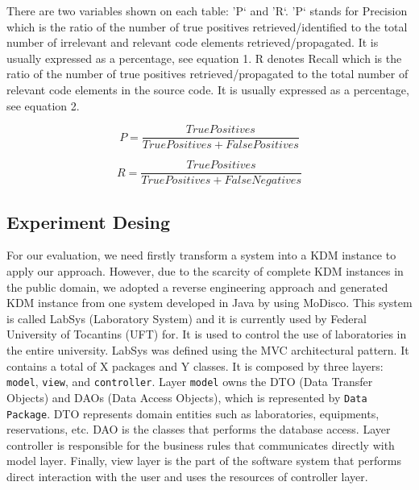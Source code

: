 
 
There are two variables shown on each table: 'P` and 'R`. 'P` stands for Precision which is the ratio of the number of true positives retrieved/identified to the total number of irrelevant and relevant code elements retrieved/propagated. It is usually expressed as a percentage, see equation 1. R denotes Recall which is the ratio of the number of true positives retrieved/propagated to the total number of relevant code elements in the
source code. It is usually expressed as a percentage, see equation 2. 

\begin{equation}
P=\frac{True Positives}{True Positives + False Positives}
\end{equation}

\begin{equation}
R=\frac{True Positives}{True Positives + False Negatives}
\end{equation}

\subsection{Experiment Desing}

For our evaluation, we need firstly transform a system into a KDM instance to apply our approach. However, due to the scarcity of complete KDM instances in the public domain, we adopted a reverse engineering approach and generated KDM instance from one system developed in Java by using MoDisco. This system is called LabSys (Laboratory System) and it is currently used by Federal University of Tocantins (UFT) for. It is used to control the use of laboratories in the entire university. %
%
%
LabSys  was defined using the MVC architectural pattern. It contains a total of X packages and Y classes. It is composed by three layers: \texttt{model}, \texttt{view}, and \texttt{controller}. Layer \texttt{model} owns the  DTO (Data Transfer Objects) and DAOs (Data Access Objects), which is represented by \texttt{Data Package}. DTO represents domain entities such as laboratories, equipments, reservations, etc. DAO is the classes that performs the database access. Layer controller is responsible for the business rules that communicates directly with model layer. Finally, view layer is the part of the software system that performs direct interaction with the user and uses the resources of controller layer.

